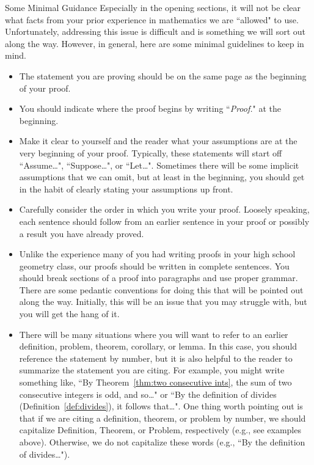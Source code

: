 \begin{section}{Some Minimal Guidance}\label{sec:minimal guidance}
Especially in the opening sections, it will not be clear what facts from your prior experience in mathematics we are ``allowed" to use.  Unfortunately, addressing this issue is difficult and is something we will sort out along the way.  However, in general, here are some minimal guidelines to keep in mind.

\begin{itemize}
\item The statement you are proving should be on the same page as the beginning of your proof.   
\item You should indicate where the proof begins by writing ``\emph{Proof.}" at the beginning.  
\item Make it clear to yourself and the reader what your assumptions are at the very beginning of your proof. Typically, these statements will start off ``Assume\ldots", ``Suppose\ldots", or ``Let\ldots".  Sometimes there will be some implicit assumptions that we can omit, but at least in the beginning, you should get in the habit of clearly stating your assumptions up front. 
\item Carefully consider the order in which you write your proof. Loosely speaking, each sentence should follow from an earlier sentence in your proof or possibly a result you have already proved.
\item Unlike the experience many of you had writing proofs in your high school geometry class, our proofs should be written in complete sentences.  You should break sections of a proof into paragraphs and use proper grammar.  There are some pedantic conventions for doing this that will be pointed out along the way.  Initially, this will be an issue that you may struggle with, but you will get the hang of it.
\item There will be many situations where you will want to refer to an earlier definition, problem, theorem, corollary, or lemma.  In this case, you should reference the statement by number, but it is also helpful to the reader to summarize the statement you are citing.  For example, you might write something like, ``By Theorem~\ref{thm:two consecutive ints}, the sum of two consecutive integers is odd, and so\ldots" or ``By the definition of divides (Definition~\ref{def:divides}), it follows that\ldots". One thing worth pointing out is that if we are citing a definition, theorem, or problem by number, we should capitalize Definition, Theorem, or Problem, respectively (e.g., see examples above). Otherwise, we do not capitalize these words (e.g., ``By the definition of divides\ldots").

\end{itemize}
\end{section}
